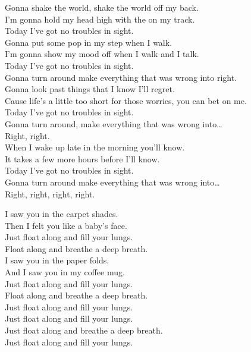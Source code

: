 


Gonna shake the world, shake the world off my back. \\
I'm gonna hold my head high with the  on my track. \\
Today I've got no troubles in sight. \\

Gonna put some pop in my step when I walk. \\
I'm gonna show my mood off when I walk and I talk. \\
Today I've got no troubles in sight. \\
Gonna turn around make everything that was wrong into right. \\

Gonna look past things that I know I'll regret. \\
Cause life's a little too short for those worries, you can bet on me. \\
Today I've got no troubles in sight. \\
Gonna turn around, make everything that was wrong into… \\
Right, right. \\

When I wake up late in the morning you'll know. \\
It takes a few more hours before I'll know. \\
Today I've got no troubles in sight. \\
Gonna turn around make everything that was wrong into… \\
Right, right, right, right. \\




I saw you in the carpet shades. \\
Then I felt you like a baby's face. \\
Just float along and fill your lungs. \\
Float along and breathe a deep breath. \\

I saw you in the paper folds. \\
And I saw you in my coffee mug. \\
Just float along and fill your lungs. \\
Float along and breathe a deep breath. \\

Just float along and fill your lungs. \\
Just float along and fill your lungs. \\
Just float along and breathe a deep breath. \\
Just float along and fill your lungs. \\
